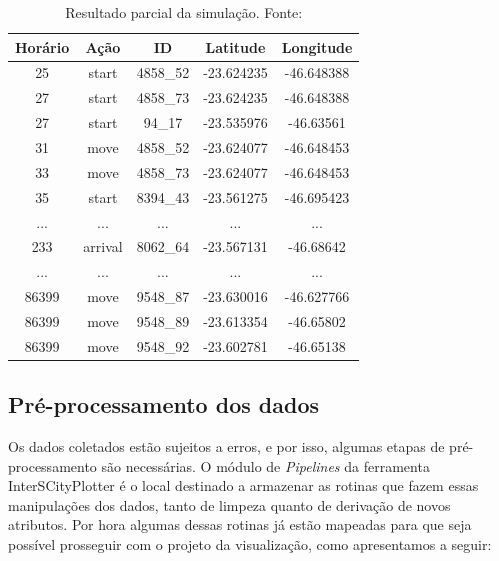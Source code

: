 \begin{table}[!htb]
\centering
\begin{tabular}{|c|c|c|c|c|}
\hline
\textbf{Horário} & \textbf{Ação} & \textbf{ID} & \textbf{Latitude} & \textbf{Longitude} \\
\hline
25 & start & 4858\_52 & -23.624235 & -46.648388 \\
27 & start & 4858\_73 & -23.624235 & -46.648388 \\
27 & start & 94\_17 & -23.535976 & -46.63561    \\
31 & move & 4858\_52 & -23.624077 & -46.648453 \\
33 & move & 4858\_73 & -23.624077 & -46.648453 \\
35 & start & 8394\_43 & -23.561275 & -46.695423 \\
... & ... & ... & ... & ... \\
233 & arrival & 8062\_64 & -23.567131 & -46.68642 \\
... & ... & ... & ... & ... \\
86399 & move & 9548\_87 & -23.630016 & -46.627766 \\
86399 & move & 9548\_89 & -23.613354 & -46.65802 \\
86399 & move & 9548\_92 & -23.602781 & -46.65138 \\
\hline
\end{tabular}
\caption{Resultado parcial da simulação. Fonte: \citet{santana2018courb} \label{table:output}}
\end{table}

\subsection{Pré-processamento dos dados}

  Os dados coletados estão sujeitos a erros, e por isso, algumas etapas de
pré-processamento são necessárias. O módulo de \emph{Pipelines} da ferramenta
InterSCityPlotter é o local destinado a armazenar as rotinas que fazem essas
manipulações dos dados, tanto de limpeza quanto de derivação de novos
atributos. Por hora algumas dessas rotinas já estão mapeadas para que seja
possível prosseguir com o projeto da visualização, como apresentamos a seguir:

